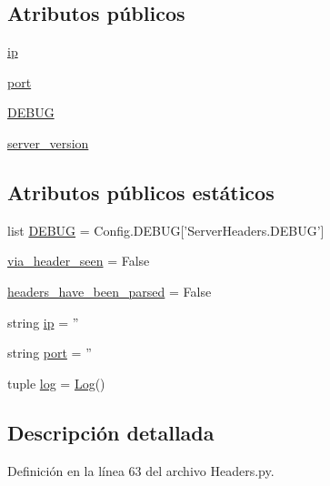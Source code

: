 \subsection*{Atributos públicos}
\begin{DoxyCompactItemize}
\item 
\hyperlink{class_headers_1_1_server_headers_a9e689b58646145828e47075285a01dfd}{ip}
\item 
\hyperlink{class_headers_1_1_server_headers_a65d328b83a9f2484d81cfff78c887a87}{port}
\item 
\hyperlink{class_headers_1_1_server_headers_a44a103ed7dd322396cbc0f403ae16c35}{D\-E\-B\-U\-G}
\item 
\hyperlink{class_headers_1_1_server_headers_a53a6310df6c7b3c19966b47313a6bdf4}{server\-\_\-version}
\end{DoxyCompactItemize}
\subsection*{Atributos públicos estáticos}
\begin{DoxyCompactItemize}
\item 
list \hyperlink{class_headers_1_1_server_headers_ad40c20e30870b97f13fb6c1b7c26901b}{D\-E\-B\-U\-G} = Config.\-D\-E\-B\-U\-G\mbox{[}'Server\-Headers.\-D\-E\-B\-U\-G'\mbox{]}
\item 
\hyperlink{class_headers_1_1_server_headers_a3ab7ddb505c5b674985f18ee4ebac340}{via\-\_\-header\-\_\-seen} = False
\item 
\hyperlink{class_headers_1_1_server_headers_af28d4aadceaef21602f69df4be674b47}{headers\-\_\-have\-\_\-been\-\_\-parsed} = False
\item 
string \hyperlink{class_headers_1_1_server_headers_ad49c893c7978250dad3f16542da29604}{ip} = ''
\item 
string \hyperlink{class_headers_1_1_server_headers_aca611671864297dbaf364e18ad40837a}{port} = ''
\item 
tuple \hyperlink{class_headers_1_1_server_headers_ac737ac570426a0a45fa1276e25a95a82}{log} = \hyperlink{class_log_1_1_log}{Log}()
\end{DoxyCompactItemize}


\subsection{Descripción detallada}


Definición en la línea 63 del archivo Headers.\-py.



